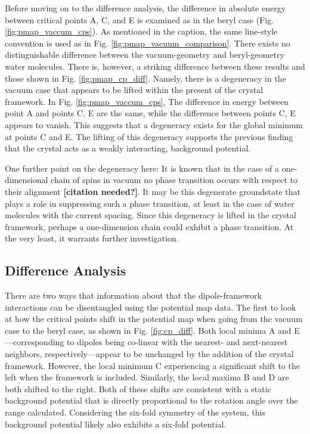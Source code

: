        Before moving on to the difference analysis, the difference in absolute energy between critical points A, C, and E is examined as in the beryl case (Fig. \ref{fig:pmap_vaccum_cps}). As mentioned in the caption, the same line-style convention is used as in Fig. \ref{fig:pmap_vacuum_comparison}. There exists no distinguishable difference between the vacuum-geometry and beryl-geometry water molecules. There is, however, a striking difference between these results and those shown in Fig. \ref{fig:pmap_cp_diff}. Namely, there is a degeneracy in the vacuum case that appears to be lifted within the present of the crystal framework. In Fig. \ref{fig:pmap_vaccum_cps}, The difference in energy between point A and points C, E are the same, while the difference between points C, E appears to vanish. This suggests that a degeneracy exists for the global minimum at points C and E. The lifting of this degeneracy supports the previous finding that the crystal acts as a weakly interacting, background potential.
        
        One further point on the degeneracy here: It is known that in the case of a one-dimensional chain of spins in vacuum no phase transition occurs with respect to their alignment \textbf{[citation needed?]}. It may be this degenerate groundstate that plays a role in suppressing such a phase transition, at least in the case of water molecules with the current spacing. Since this degeneracy is lifted in the crystal framework, perhaps a one-dimension chain could exhibit a phase transition. At the very least, it warrants further investigation.
        
        \subsection{Difference Analysis}
        \label{sec:diff_anal}
        
        There are two ways that information about that the dipole-framework interactions can be disentangled using the potential map data. The first to look at how the critical points shift in the potential map when going from the vacuum case to the beryl case, as shown in Fig. \ref{fig:cp_diff}. Both local minima A and E---corresponding to dipoles being co-linear with the nearest- and next-nearest neighbors, respectively---appear to be unchanged by the addition of the crystal framework. However, the local minimum C experiencing a significant shift to the left when the framework is included. Similarly, the local maxima B and D are both shifted to the right. Both of these shifts are consistent with a static background potential that is directly proportional to the rotation angle over the range calculated. Considering the six-fold symmetry of the system, this background potential likely also exhibits a six-fold potential.
        
